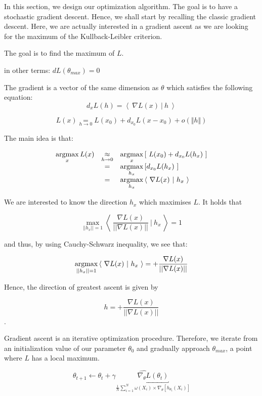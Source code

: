 In this section, we design our optimization algorithm. The goal is to have a stochastic gradient descent. Hence, we shall start by recalling the classic gradient descent. Here, we are actually interested in a gradient ascent as we are looking for the maximum of the Kullback-Leibler criterion. 

\bigskip

The goal is to find the maximum of $L$.

in other terms: $dL(\theta_{max}) = 0$

The gradient is a vector of the same dimension as $\theta$ which satisfies the following equation: $$d_xL(h) = \left< \ \nabla L(x) \ | \ h \ \right>$$

$$L(x) \underset{h \rightarrow 0}{=} L(x_0) + d_{x_0}L(x - x_0) + o( \Vert h \Vert )$$

The main idea is that:

$$
\begin{array}{rcl}
\argmax\limits_x L(x) &\underset{h \rightarrow 0}{\approx}& \argmax\limits_{x} \left[ \ L(x_0) + d_{x_0}L(h_x) \ \right]
\\
& = &
\argmax\limits_{h_x} \left[ d_{x_0}L(h_x) \ \right]
\\
& = &
\argmax\limits_{h_x} \left< \ \nabla L(x) \ | \ h_x \ \right>
\end{array}
$$


We are interested to know the direction $h_x$ which maximises $L$. It holds that

$$\underset{||h_x|| = 1}{\operatorname{max}} \left< \ \frac{\nabla L(x)}{|| \nabla L(x) ||} \ | \ h_x \ \right> = 1$$

 and thus, by using Cauchy-Schwarz inequality, we see that:

$$\argmax_{||h_x|| = 1} \left< \ {\nabla L(x)} \ | \ h_x \ \right> = {+} \frac{\nabla L(x)}{|| \nabla L(x) ||}$$

Hence, the direction of greatest ascent is given by

$$h = + \frac{\nabla L(x)}{|| \nabla L(x) ||}$$.

\bigskip

Gradient ascent is an iterative optimization procedure.
Therefore, we iterate from an initialization value of our parameter $\theta_0$ and gradually approach $\theta_{max}$, a point where $L$ has a local maximum.

\bigskip

$$\boxed{\theta_{t+1} \leftarrow \theta_t + \gamma \underbracket{ \widehat{\nabla_\theta L}(\theta_t)}_{\frac 1 N \displaystyle\sum_{i = 1}^N \omega(X_i) \times \nabla_\theta \left[ h_{\theta_t}(X_i)\right]}}$$

